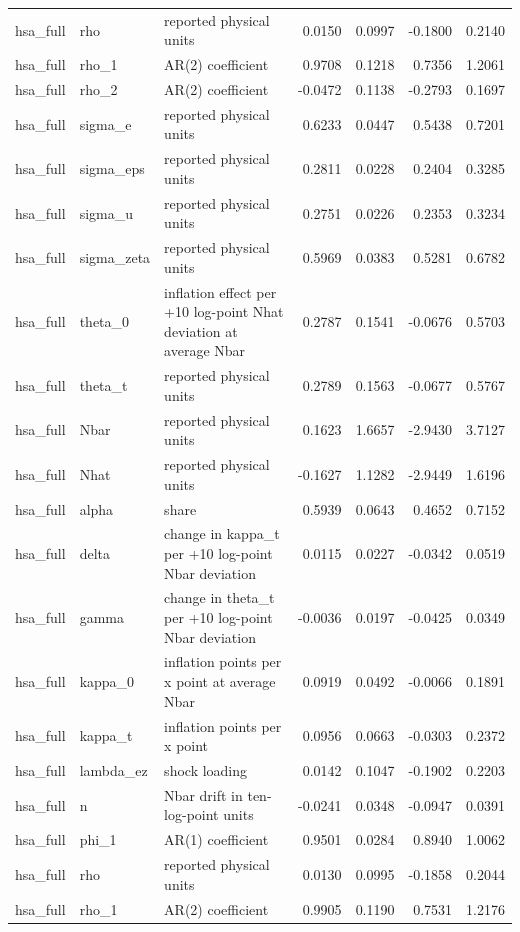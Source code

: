 \begin{tabular}{lllrrrr}
hsa\_full & rho & reported physical units & 0.0150 & 0.0997 & -0.1800 & 0.2140 \\
hsa\_full & rho\_1 & AR(2) coefficient & 0.9708 & 0.1218 & 0.7356 & 1.2061 \\
hsa\_full & rho\_2 & AR(2) coefficient & -0.0472 & 0.1138 & -0.2793 & 0.1697 \\
hsa\_full & sigma\_e & reported physical units & 0.6233 & 0.0447 & 0.5438 & 0.7201 \\
hsa\_full & sigma\_eps & reported physical units & 0.2811 & 0.0228 & 0.2404 & 0.3285 \\
hsa\_full & sigma\_u & reported physical units & 0.2751 & 0.0226 & 0.2353 & 0.3234 \\
hsa\_full & sigma\_zeta & reported physical units & 0.5969 & 0.0383 & 0.5281 & 0.6782 \\
hsa\_full & theta\_0 & inflation effect per +10 log-point Nhat deviation at average Nbar & 0.2787 & 0.1541 & -0.0676 & 0.5703 \\
hsa\_full & theta\_t & reported physical units & 0.2789 & 0.1563 & -0.0677 & 0.5767 \\
hsa\_full & Nbar & reported physical units & 0.1623 & 1.6657 & -2.9430 & 3.7127 \\
hsa\_full & Nhat & reported physical units & -0.1627 & 1.1282 & -2.9449 & 1.6196 \\
hsa\_full & alpha & share & 0.5939 & 0.0643 & 0.4652 & 0.7152 \\
hsa\_full & delta & change in kappa\_t per +10 log-point Nbar deviation & 0.0115 & 0.0227 & -0.0342 & 0.0519 \\
hsa\_full & gamma & change in theta\_t per +10 log-point Nbar deviation & -0.0036 & 0.0197 & -0.0425 & 0.0349 \\
hsa\_full & kappa\_0 & inflation points per x point at average Nbar & 0.0919 & 0.0492 & -0.0066 & 0.1891 \\
hsa\_full & kappa\_t & inflation points per x point & 0.0956 & 0.0663 & -0.0303 & 0.2372 \\
hsa\_full & lambda\_ez & shock loading & 0.0142 & 0.1047 & -0.1902 & 0.2203 \\
hsa\_full & n & Nbar drift in ten-log-point units & -0.0241 & 0.0348 & -0.0947 & 0.0391 \\
hsa\_full & phi\_1 & AR(1) coefficient & 0.9501 & 0.0284 & 0.8940 & 1.0062 \\
hsa\_full & rho & reported physical units & 0.0130 & 0.0995 & -0.1858 & 0.2044 \\
hsa\_full & rho\_1 & AR(2) coefficient & 0.9905 & 0.1190 & 0.7531 & 1.2176 \\

\end{tabular}
